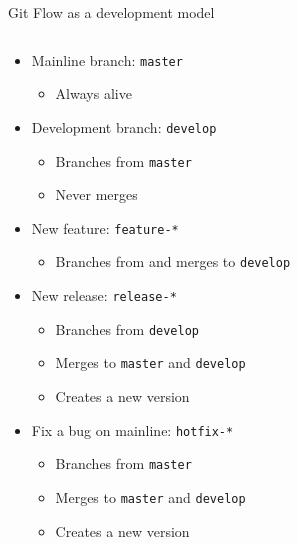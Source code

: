 \documentclass[presentation]{beamer}
\begin{document}
\begin{frame}[fragile]{Git Flow as a development model}
	\begin{columns}
		\begin{column}{.53\textwidth}
			\begin{itemize}
				\item Mainline branch: \texttt{master}
				\begin{itemize}
					\item Always alive
				\end{itemize}
				\item Development branch: \texttt{develop}
				\begin{itemize}
					\item Branches from \texttt{master}
					\item Never merges
				\end{itemize}
				\item New feature: \texttt{feature-*}
				\begin{itemize}
					\item Branches from and merges to \texttt{develop}
				\end{itemize}
				\item New release: \texttt{release-*}
				\begin{itemize}
					\item Branches from \texttt{develop}
					\item Merges to \texttt{master} and \texttt{develop}
					\item Creates a new version
				\end{itemize}
				\item Fix a bug on mainline: \texttt{hotfix-*}
				\begin{itemize}
					\item Branches from \texttt{master}
					\item Merges to \texttt{master} and \texttt{develop}
					\item Creates a new version
				\end{itemize}
			\end{itemize}
		\end{column}
		\begin{column}{.47\textwidth}
			\begin{center}

\end{center}
\end{column}
\end{columns}
\end{frame}
\end{document}
